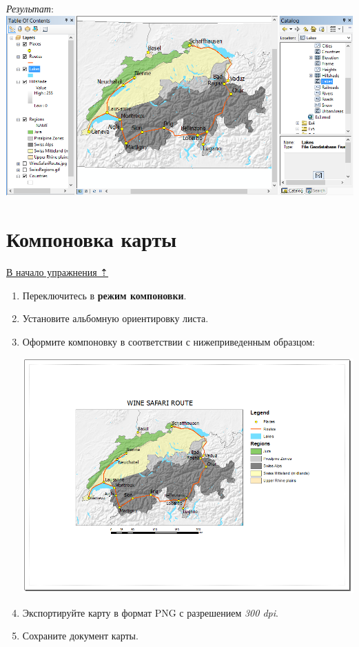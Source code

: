 \documentclass[]{book}
\theoremstyle{definition}
\theoremstyle{definition}
\theoremstyle{definition}
\theoremstyle{remark}
\begin{document}
\begin{enumerate}
  \emph{Результат}: \includegraphics{images/Ex07/image36.png}
\end{enumerate}

\hypertarget{map-ref-general-layout}{%
\section{Компоновка карты}\label{map-ref-general-layout}}

\protect\hyperlink{map-ref-general}{В начало упражнения ⇡}

\begin{enumerate}
\def\labelenumi{\arabic{enumi}.}
\item
  Переключитесь в \textbf{режим компоновки}.
\item
  Установите альбомную ориентировку листа.
\item
  Оформите компоновку в соответствии с нижеприведенным образцом:

  \includegraphics{images/Ex07/image37.png}
\item
  Экспортируйте карту в формат PNG с разрешением \emph{300 dpi}.
\item
  Сохраните документ карты.
\end{enumerate}
\end{document}

